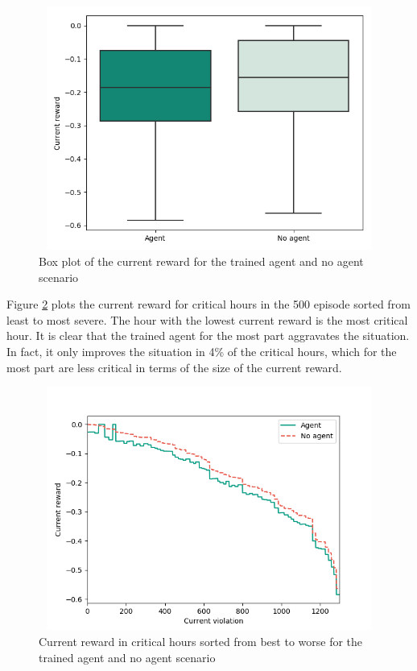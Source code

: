 \documentclass[class=book, crop=false, 11pt]{standalone}
\begin{document}
\begin{figure}[h]
    \center
\includegraphics[height=8cm, width=12cm]{figures/config1_current_boxplot.png}
    \caption[size = 9]{Box plot of the current reward for the trained agent and no agent scenario}
    \label{fig:results:config1_current_boxplot}
\end{figure}
Figure \ref{fig:results:config1_sorted_current} plots the current reward for critical hours in the 500 episode sorted from least to most severe. The hour with the lowest current reward is the most critical hour. It is clear that the trained agent for the most part aggravates the situation. In fact, it only improves the situation in 4\% of the critical hours, which for the most part are less critical in terms of the size of the current reward. 

\begin{figure}[h]
    \center
\includegraphics[height=8cm, width=12cm]{figures/config1_sorted_current.png}
    \caption[size = 9]{Current reward in critical hours sorted from best to worse for the trained agent and no agent scenario}
    \label{fig:results:config1_sorted_current}
\end{figure}
\end{document}

